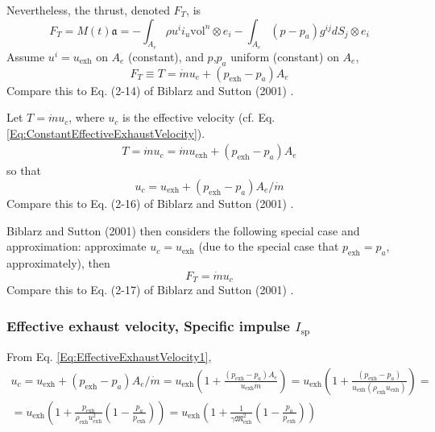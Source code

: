 \documentclass[10pt]{amsart}
\begin{document}
\begin{multicols*}{2}
Nevertheless, the thrust, denoted $F_T$, is 
\begin{equation}\label{Eq:GeneralizedThrust}
F_T = M(t) \mathfrak{a} = -\int_{A_e} \rho u^i i_u \text{vol}^n \otimes e_i - \int_{A_e} (p-p_a)g^{ij} dS_j \otimes e_i 
\end{equation}
Assume $u^i = u_{\text{exh}}$ on $A_e$ (constant), and $p$,$p_a$ uniform (constant) on $A_e$, 
\begin{equation}
F_T \equiv T = \dot{m} u_e + (p_{\text{exh}} - p_a) A_e
\end{equation}
Compare this to Eq. (2-14) of Biblarz and Sutton (2001) \cite{GSuttonOBiblarz2001}.

Let $T = \dot{m} u_c$, where $u_c$ is the effective velocity (cf. Eq. \ref{Eq:ConstantEffectiveExhaustVelocity}).
\[
\begin{gathered}
T = \dot{m} u_c = \dot{m} u_{\text{exh}} + (p_{\text{exh}} - p_a) A_e
\end{gathered}
\]
so that
\begin{equation}\label{Eq:EffectiveExhaustVelocity1}
u_c = u_{\text{exh}} + (p_{\text{exh}} - p_a) A_e/ \dot{m} 
\end{equation}
Compare this to Eq. (2-16) of Biblarz and Sutton (2001) \cite{GSuttonOBiblarz2001}.

Biblarz and Sutton (2001) \cite{GSuttonOBiblarz2001} then considers the following special case and approximation: approximate $u_c = u_{\text{exh}}$ (due to the special case that $p_{\text{exh}} = p_a$, approximately), then
\begin{equation}\label{Eq:ThrustWhenAmbientPressureEqualsExhaustPressure}
F_T = \dot{m} u_c
\end{equation}
Compare this to Eq. (2-17) of Biblarz and Sutton (2001) \cite{GSuttonOBiblarz2001}.

\subsubsection{Effective exhaust velocity, Specific impulse $I_{\text{sp}}$}

From Eq. \ref{Eq:EffectiveExhaustVelocity1}, 
\begin{equation}
\begin{gathered}
u_c = u_{\text{exh}} + (p_{\text{exh}} - p_a) A_e/ \dot{m} = u_{\text{exh}} \left( 1 + \frac{ (p_{\text{exh}} - p_a) A_e }{u_{\text{exh}} \dot{m} } \right)= u_{\text{exh}} \left( 1 + \frac{(p_{\text{exh}} - p_a) }{ u_{\text{exh}} ( \rho_{\text{exh}} u_{\text{exh}}) } \right) = \\
= u_{\text{exh}} \left( 1 + \frac{p_{\text{exh}}}{ \rho_{\text{exh}} u^2_{\text{exh}} } \left( 1 - \frac{ p_a}{ p_{\text{exh}} } \right) \right) = u_{\text{exh}} \left( 1 + \frac{1}{ \gamma \mathfrak{M}^2_{\text{exh}} } \left( 1 - \frac{p_a}{p_{\text{exh}}} \right) \right) 
\end{gathered}
\end{equation}


\end{multicols*}
\end{document}
